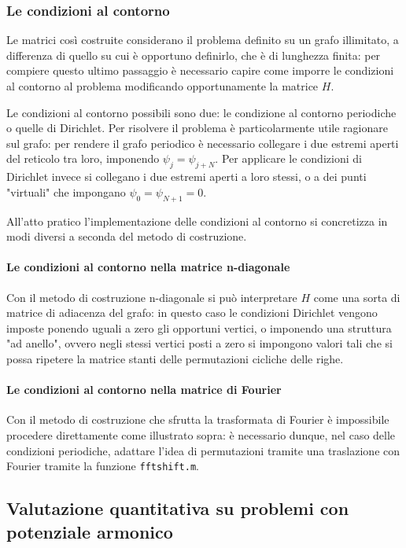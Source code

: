\documentclass[a4paper,11pt,twoside,twocolumn]{article}
\begin{document}
\subsubsection{Le condizioni al contorno}

Le matrici così costruite considerano il problema definito su un grafo illimitato, a differenza di quello su cui è opportuno definirlo, che è di lunghezza finita: per compiere questo ultimo passaggio è necessario capire come imporre le condizioni al contorno al problema modificando opportunamente la matrice \(H\).

Le condizioni al contorno possibili sono due: le condizione al contorno periodiche o quelle di Dirichlet. Per risolvere il problema è particolarmente utile ragionare sul grafo: per rendere il grafo periodico è necessario collegare i due estremi aperti del reticolo tra loro, imponendo \(\psi_j=\psi_{j+N}\).
Per applicare le condizioni di Dirichlet invece si collegano i due estremi aperti a loro stessi, o a dei punti "virtuali" che impongano \(\psi_0=\psi_{N+1}=0\).

All'atto pratico l'implementazione delle condizioni al contorno si concretizza in modi diversi a seconda del metodo di costruzione.

\paragraph{Le condizioni al contorno nella matrice n-diagonale}
Con il metodo di costruzione n-diagonale si può interpretare \(H\) come una sorta di matrice di adiacenza del grafo: in questo caso le condizioni Dirichlet vengono imposte ponendo uguali a zero gli opportuni vertici, o imponendo una struttura "ad anello", ovvero negli stessi vertici posti a zero si impongono valori tali che si possa ripetere la matrice stanti delle permutazioni cicliche delle righe.

\paragraph{Le condizioni al contorno nella matrice di Fourier}
Con il metodo di costruzione che sfrutta la trasformata di Fourier è impossibile procedere direttamente come illustrato sopra: è necessario dunque, nel caso delle condizioni periodiche, adattare l'idea di permutazioni tramite una traslazione con Fourier tramite la funzione \verb|fftshift.m|.

\subsection{Valutazione quantitativa su problemi con potenziale armonico}
\end{document}
